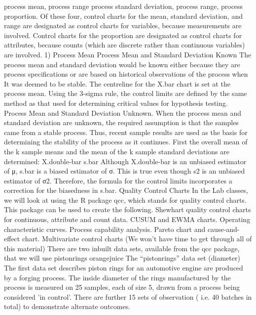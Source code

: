 process mean, process range process standard deviation, process range, process proportion. Of these four, control charts for the mean, standard deviation, and range are designated as control charts for variables, because measurements are involved. Control charts for the proportion are designated as control charts for attributes, because counts (which are discrete rather than continuous variables) are involved. 1) Process Mean Process Mean and Standard Deviation Known The process mean and standard deviation would be known either because they are process specifications or are based on historical observations of the process when It was deemed to be stable. The centreline for the X.bar chart is set at the process mean. Using the 3-sigma rule, the control limits are defined by the same method as that used for determining critical values for hypothesis testing.
Process Mean and Standard Deviation Unknown.
When the process mean and standard deviation are unknown, the required assumption is that the samples came from a stable process. Thus, recent sample results are used as the basis for determining the stability of the process as it continues. First the overall mean of the k sample means and the mean of the k sample standard deviations are determined:
X.double-bar
s.bar
Although X.double-bar is an unbiased estimator of μ, s.bar is a biased estimator of σ. This is true even though s2 is an unbiased estimator of σ2.
Therefore, the formula for the control limits incorporates a correction for the biasedness in s.bar.
Quality Control Charts
In the Lab classes, we will look at using the R package qcc, which stands for quality control charts. This package can be used to create the following. Shewhart quality control charts for continuous, attribute and count data. CUSUM and EWMA charts. Operating characteristic curves. Process capability analysis. Pareto chart and cause-and-effect chart. Multivariate control charts
(We won’t have time to get through all of this material)
There are two inbuilt data sets, available from the qcc package, that we will use pistonrings orangejuice
The “pistonrings” data set (diameter)
The first data set describes piston rings for an automotive engine are produced by a forging process.
The inside diameter of the rings manufactured by the process is measured on 25 samples, each of size 5, drawn from a process being considered 'in control'.
There are further 15 sets of observation ( i.e. 40 batches in total) to demonstrate alternate outcomes.
